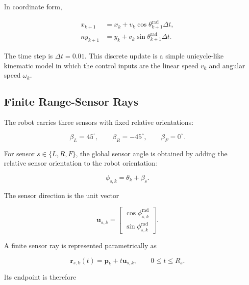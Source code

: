 \documentclass[10pt,twocolumn,a4paper]{article}
\begin{document}
In coordinate form,

\begin{align}
    x_{k+1}
    &=x_k+v_k\cos\theta_{k+1}^{\mathrm{rad}}\Delta t,
    \\n    y_{k+1}
    &=y_k+v_k\sin\theta_{k+1}^{\mathrm{rad}}\Delta t.
    \label{eq:coordinate_update}
\end{align}

The time step is $\Delta t=0.01$. This discrete update is a simple
unicycle-like kinematic model in which the control inputs are the linear
speed $v_k$ and angular speed $\omega_k$.

\subsection{Finite Range-Sensor Rays}

The robot carries three sensors with fixed relative orientations:

\begin{equation}
    \beta_L=45^{\circ},
    \qquad
    \beta_R=-45^{\circ},
    \qquad
    \beta_F=0^{\circ}.
    \label{eq:sensor_relative_angles}
\end{equation}

For sensor $s\in\{L,R,F\}$, the global sensor angle is obtained by
adding the relative sensor orientation to the robot orientation:

\begin{equation}
    \phi_{s,k}=\theta_k+\beta_s.
    \label{eq:sensor_global_angle}
\end{equation}

The sensor direction is the unit vector

\begin{equation}
    \mathbf{u}_{s,k}
    =
    \begin{bmatrix}
        \cos\phi_{s,k}^{\mathrm{rad}}\\
        \sin\phi_{s,k}^{\mathrm{rad}}
    \end{bmatrix}.
    \label{eq:sensor_direction}
\end{equation}

A finite sensor ray is represented parametrically as

\begin{equation}
    \mathbf{r}_{s,k}(t)
    =
    \mathbf{p}_k+t\mathbf{u}_{s,k},
    \qquad
    0\leq t\leq R_s.
    \label{eq:sensor_ray}
\end{equation}

Its endpoint is therefore
\end{document}
